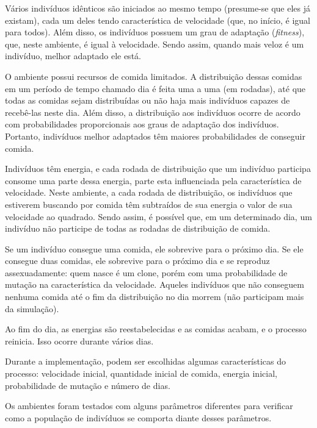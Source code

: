 \documentclass[10pt,brazil,english]{article}
\begin{document}
                Vários indivíduos idênticos são iniciados ao mesmo tempo (presume-se que eles já existam), cada um deles tendo característica de velocidade (que, no início, é igual para todos). Além disso, os indivíduos possuem um grau de adaptação (\textit{fitness}), que, neste ambiente, é igual à velocidade. Sendo assim, quando mais veloz é um indivíduo, melhor adaptado ele está.
                
                O ambiente possui recursos de comida limitados. A distribuição dessas comidas em um período de tempo chamado dia é feita uma a uma (em rodadas), até que todas as comidas sejam distribuídas ou não haja mais indivíduos capazes de recebê-las neste dia. Além disso, a distribuição aos indivíduos ocorre de acordo com probabilidades proporcionais aos graus de adaptação dos indivíduos. Portanto, indivíduos melhor adaptados têm maiores probabilidades de conseguir comida.
                
                Indivíduos têm energia, e cada rodada de distribuição que um indivíduo participa consome uma parte dessa energia, parte esta influenciada pela característica de velocidade. Neste ambiente, a cada rodada de distribuição, os indivíduos que estiverem buscando por comida têm subtraídos de sua energia o valor de sua velocidade ao quadrado. Sendo assim, é possível que, em um determinado dia, um indivíduo não participe de todas as rodadas de distribuição de comida.
                
                Se um indivíduo consegue uma comida, ele sobrevive para o próximo dia. Se ele consegue duas comidas, ele sobrevive para o próximo dia e se reproduz assexuadamente: quem nasce é um clone, porém com uma probabilidade de mutação na característica da velocidade. Aqueles indivíduos que não conseguem nenhuma comida até o fim da distribuição no dia morrem (não participam mais da simulação).
                
                Ao fim do dia, as energias são reestabelecidas e as comidas acabam, e o processo reinicia. Isso ocorre durante vários dias.
                
                Durante a implementação, podem ser escolhidas algumas características do processo: velocidade inicial, quantidade inicial de comida, energia inicial, probabilidade de mutação e número de dias.
                
                Os ambientes foram testados com alguns parâmetros diferentes para verificar como a população de indivíduos se comporta diante desses parâmetros.
            
\end{document}
